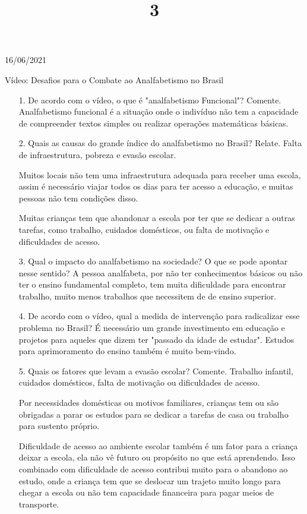 \documentclass{SchoolBook}
\begin{document}
    \begin{day}{16/06/2021}
        \title{3}{Vídeo: Desafios para o Combate ao Analfabetismo no Brasil}
        
        \begin{enumerate}
            \item[1.] De acordo com o vídeo, o que é "analfabetismo Funcional"? Comente.
            \response Analfabetismo funcional é a situação onde o indivíduo não tem a capacidade de compreender textos simples ou realizar operações matemáticas básicas.
            
            \item[2.] Quais as causas do grande índice do analfabetismo no Brasil? Relate.
            \response Falta de infraestrutura, pobreza e evasão escolar.
            
            Muitos locais não tem uma infraestrutura adequada para receber uma escola, assim é necessário viajar todos os dias para ter acesso a educação, e muitas pessoas não tem condições disso.
            
            Muitas crianças tem que abandonar a escola por ter que se dedicar a outras tarefas, como trabalho, cuidados domésticos, ou falta de motivação e dificuldades de acesso.
            
            \item[3.] Qual o impacto do analfabetismo na sociedade? O que se pode apontar nesse sentido?
            \response A pessoa analfabeta, por não ter conhecimentos básicos ou não ter o ensino fundamental completo, tem muita dificuldade para encontrar trabalho, muito menos trabalhos que necessitem de de ensino superior.
            
            \item[4.] De acordo com o vídeo, qual a medida de intervenção para radicalizar esse problema no Brasil?
            \response É necessário um grande investimento em educação e projetos para aqueles que dizem ter "passado da idade de estudar". Estudos para aprimoramento do ensino também é muito bem-vindo.
            
            \item[5.] Quais os fatores que levam a evasão escolar? Comente.
            \response Trabalho infantil, cuidados domésticos, falta de motivação ou dificuldades de acesso.
            
            Por necessidades domésticas ou motivos familiares, crianças tem ou são obrigadas a parar os estudos para se dedicar a tarefas de casa ou trabalho para sustento próprio.
            
            Dificuldade de acesso ao ambiente escolar também é um fator para a criança deixar a escola, ela não vê futuro ou propósito no que está aprendendo. Isso combinado com dificuldade de acesso contribui muito para o abandono ao estudo, onde a criança tem que se deslocar um trajeto muito longo para chegar a escola ou não tem capacidade financeira para pagar meios de transporte.
        \end{enumerate} 
    \end{day}
\end{document}
